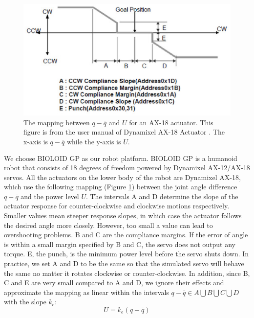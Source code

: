 \begin{figure}[t]
\centering
\includegraphics[width=5in]{figures/ax18gain.eps}
\caption{The mapping between $q-\bar{q}$ and $U$ for an AX-18 actuator. This figure is from the user manual of Dynamixel AX-18 Actuator \cite{AX18:2015}. The x-axis is $q-\bar{q}$ while the y-axis is $U$.}
\label{fig:actuatorMap}
\end{figure}

We choose BIOLOID GP as our robot platform. BIOLOID GP is a humanoid robot that consists of 18 degrees of freedom powered by Dynamixel AX-12/AX-18 servos. All the actuators on the lower body of the robot are Dynamixel AX-18, which use the following mapping (Figure \ref{fig:actuatorMap}) between the joint angle difference $q-\bar{q}$ and the power level $U$. The intervals A and D determine the slope of the actuator response for counter-clockwise and clockwise motions respectively. Smaller values mean steeper response slopes, in which case the actuator follows the desired angle more closely. However, too small a value can lead to overshooting problems. B and C are the compliance margins. If the error of angle is within a small margin specified by B and C, the servo does not output any torque. E, the punch, is the minimum power level before the servo shuts down. In practice, we set A and D to be the same so that the simulated servo will behave the same no matter it rotates clockwise or counter-clockwise. In addition, since B, C and E are very small compared to A and D, we ignore their effects and approximate the mapping as linear within the intervals $q-\bar{q}\in A\bigcup B\bigcup C\bigcup D$ with the slope $k_e$:
\begin{equation}
  U=k_e(q-\bar{q})
  \label{eqn:voltageErrorRelation}
\end{equation}

